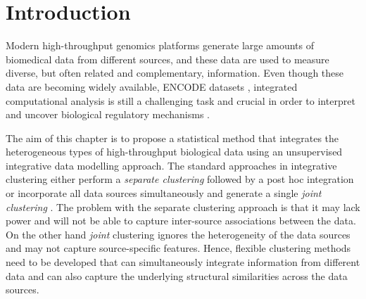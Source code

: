 \section{Introduction} \label{integr-intro-sect}
Modern high-throughput genomics platforms generate large amounts of biomedical data from different sources, and these data are used to measure diverse, but often related and complementary, information. Even though these data are becoming widely available, \eg ENCODE datasets \citep{Dunham2012}, integrated computational analysis is still a challenging task and crucial in order to interpret and uncover biological regulatory mechanisms \citep{Park2009}.   

The aim of this chapter is to propose a statistical method that integrates the heterogeneous types of high-throughput biological data using an unsupervised integrative data modelling approach. The standard approaches in integrative clustering either perform a \emph{separate clustering} followed by a post hoc integration \citep{Wang2011} or incorporate all data sources simultaneously and generate a single \emph{joint clustering} \citep{Kormaksson2012, Mo2013}. The problem with the separate clustering approach is that it may lack power and will not be able to capture inter-source associations between the data. On the other hand \emph{joint} clustering ignores the heterogeneity of the data sources and may not capture source-specific features. Hence, flexible clustering methods need to be developed that can simultaneously integrate information from different data and can also capture the underlying structural similarities across the data sources.
